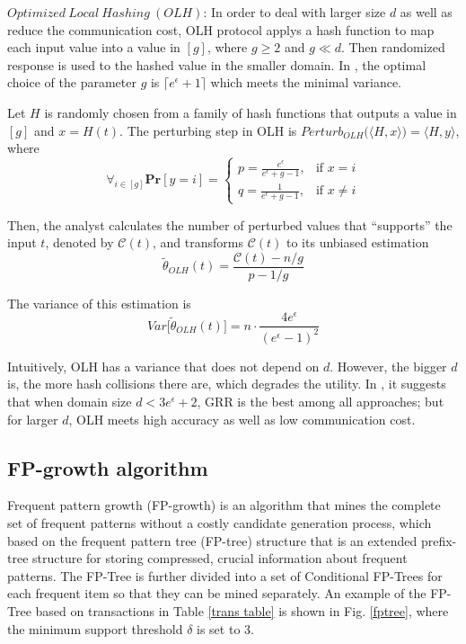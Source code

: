 \documentclass[conference]{IEEEtran}
\begin{document}
$Optimized\ Local\ Hashing\ (OLH)$\cite{a8}: In order to deal with larger size $d$ as well as reduce the communication cost, OLH protocol applys a hash function to map each input value into a value in $[g]$, where $g \geq 2$ and $g \ll d$. Then randomized response is used to the hashed value in the smaller domain. In \cite{a8}, the optimal choice of the parameter $g$ is $\lceil e^{\epsilon}+1 \rceil$ which meets the minimal variance.

Let $H$ is randomly chosen from a family of hash functions that outputs a value in $[g]$ and $x = H(t)$. The perturbing step in OLH is $Perturb_{OLH} \big(\langle H,x \rangle \big) = \langle H,y \rangle$, where
$$\forall_{i\in [g]} \mathbf{Pr} [y=i] = 
\begin{cases}
p = \frac{e^{\epsilon}}{e^{\epsilon}+g-1},&\text{if $x=i$} \\
q = \frac{1}{e^{\epsilon}+g-1},&\text{if $x\neq i$}
\end{cases}
$$

Then, the analyst calculates the number of perturbed values that ``supports'' the input $t$, denoted by $\mathcal{C}(t)$, and transforms $\mathcal{C}(t)$ to its unbiased estimation
\begin{equation}
\tilde{\theta}_{OLH}(t) = \frac{\mathcal{C}(t) - n/g}{p-1/g}
\label{olh aggregate}
\end{equation}

The variance of this estimation is 
\begin{equation}
Var\big[\tilde{\theta}_{OLH}(t)\big] =n \cdot \frac{4e^{\epsilon}}{{(e^{\epsilon}-1)}^2}
\label{olh variance}
\end{equation}

Intuitively, OLH has a variance that does not depend on $d$. However, the bigger $d$ is, the more hash collisions there are, which degrades the utility. In \cite{a8}, it suggests that when domain size $d<3e^{\epsilon} +2$, GRR is the best among all approaches; but for larger $d$, OLH meets high accuracy as well as low communication cost.

\subsection{FP-growth algorithm}
Frequent pattern growth (FP-growth)\cite{fp} is an algorithm that mines the complete set of frequent patterns without a costly candidate generation process, which based on the frequent pattern tree (FP-tree) structure that is an extended prefix-tree structure for storing compressed, crucial information about frequent patterns. The FP-Tree is further divided into a set of Conditional FP-Trees for each frequent item so that they can be mined separately. An example of the FP-Tree based on transactions in Table \ref{trans table} is shown in Fig. \ref{fptree}, where the minimum support threshold $\delta$ is set to 3.
\end{document}
